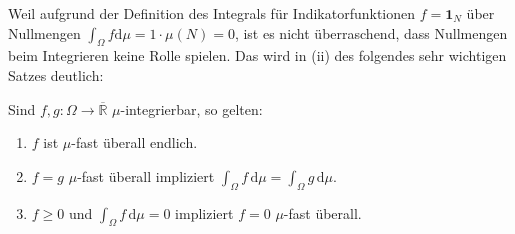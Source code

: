 Weil aufgrund der Definition des Integrals f\"ur Indikatorfunktionen $f=\mathbf 1_N$ \"uber Nullmengen $\int_\Omega f \mathrm{d} \mu=1\cdot \mu(N)=0$, ist es nicht \"uberraschend, dass Nullmengen beim Integrieren keine Rolle spielen. Das wird in (ii) des folgendes sehr wichtigen Satzes deutlich:
\begin{satz}\label{S7}
	Sind $f,g \colon \Omega \rightarrow \overline{\mathbb{R}}$ $\mu$-integrierbar, so gelten:
	\begin{enumerate}[label=(\roman*)]
		\item $f$ ist $\mu$-fast überall endlich.
		\item $f=g$ $\mu$-fast überall impliziert
		$ \int_{\Omega} f \,\mathrm{d}\mu = \int_{\Omega} g\, \mathrm{d}\mu.$
		\item $f \geq 0$ und $ \int_{\Omega} f\, \mathrm{d} \mu=0$ impliziert $f = 0$ $\mu$-fast überall.
	\end{enumerate}
\end{satz}
